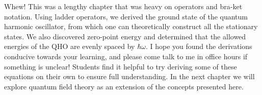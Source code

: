 Whew! This was a lengthy chapter that was heavy on operators and bra-ket notation. 
Using ladder operators, we derived the ground state of the quantum harmonic oscillator, from which one can theoretically construct all the stationary states. 
We also discovered zero-point energy and determined that the allowed energies of the QHO are evenly spaced by $\hbar\omega$. 
I hope you found the derivations conducive towards your learning, and please come talk to me in office hours if something is unclear! 
Students find it helpful to try deriving some of these equations on their own to ensure full understanding. 
In the next chapter we will explore quantum field theory as an extension of the concepts presented here.

%